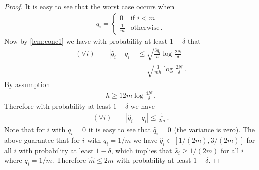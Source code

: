 \documentclass{article}
\newcommand{\eq}[1]{\begin{align*}#1\end{align*}}
\theoremstyle{plain}
\theoremstyle{definition}
\begin{document}
\begin{proof}
It is easy to see that the worst case occurs when 
\eq{
q_i = \begin{cases}
0 & \text{if } i < m \\
\frac{1}{m} & \text{otherwise}\,.
\end{cases}
}
Now by \cref{lem:conc1} we have with probability at least $1 - \delta$ that 
\eq{
(\forall i) \qquad \left| \hat q_i - q_i\right| 
&\leq \sqrt{\frac{3q_i}{h} \log \frac{2N}{\delta}} \\
&= \sqrt{\frac{3}{mh} \log\frac{2N}{\delta}}\,. 
}
By assumption 
\eq{
h \geq 12m \log \frac{4N}{\delta}\,.
}
Therefore with probability at least $1 - \delta$ we have
\eq{
(\forall i) \qquad \left|\hat q_i - q_i\right| \leq \frac{1}{2m}\,.
}
Note that for $i$ with $q_i = 0$ it is easy to see that $\hat q_i = 0$ (the variance is zero). The above guarantee that
for $i$ with $q_i = 1/m$ we have $\hat q_i \in [1/(2m), 3/(2m)]$ for all $i$ with probability at least $1 - \delta$,
which implies that $\hat s_i \geq 1/(2m)$ for all $i$ where $q_i = 1/m$.
Therefore $\hat m \leq 2m$ with probability at least $1 - \delta$. 
\end{proof}
\end{document}

